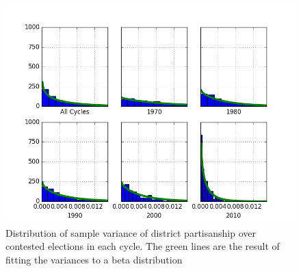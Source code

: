 \documentclass[preprint,12pt]{article}
\begin{document}
\begin{figure}[htb!]
    \begin{center}
        \includegraphics[scale=0.8]{../Figures/HistoricAsymmetry/VarHist.png}
        \caption{Distribution of sample variance of district partisanship over contested elections in each cycle. The green lines are the result of fitting the variances to a beta distribution}\label{fig:varHist}
    \end{center}
\end{figure}
\end{document}
